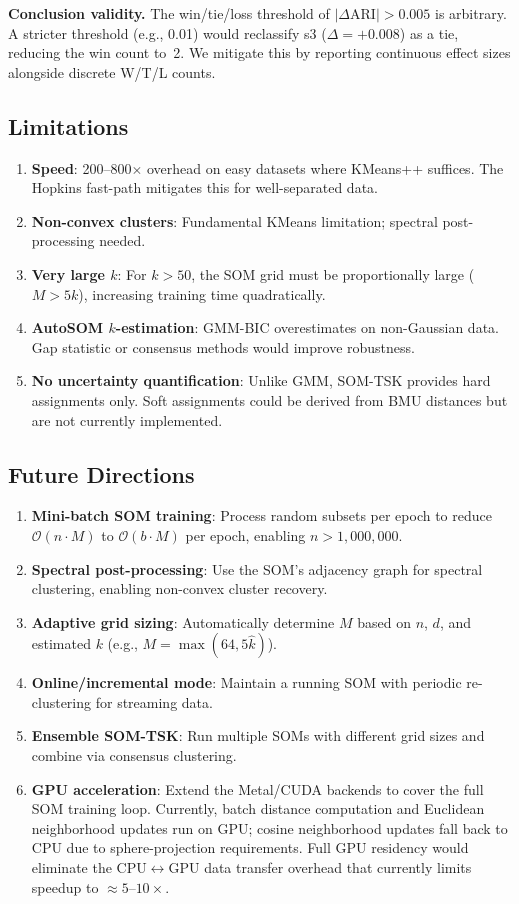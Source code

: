 \documentclass[journal]{IEEEtran}
\begin{document}
\textbf{Conclusion validity.}
The win/tie/loss threshold of $|\Delta\mathrm{ARI}| > 0.005$ is arbitrary.
A stricter threshold (e.g., 0.01) would reclassify s3 ($\Delta = +0.008$) as a tie, reducing the win count to~2.
We mitigate this by reporting continuous effect sizes alongside discrete W/T/L counts.

\subsection{Limitations}

\begin{enumerate}
  \item \textbf{Speed}: 200--800$\times$ overhead on easy datasets where KMeans++ suffices. The Hopkins fast-path mitigates this for well-separated data.
  \item \textbf{Non-convex clusters}: Fundamental KMeans limitation; spectral post-processing needed.
  \item \textbf{Very large $k$}: For $k > 50$, the SOM grid must be proportionally large ($M > 5k$), increasing training time quadratically.
  \item \textbf{AutoSOM $k$-estimation}: GMM-BIC overestimates on non-Gaussian data. Gap statistic or consensus methods would improve robustness.
  \item \textbf{No uncertainty quantification}: Unlike GMM, SOM-TSK provides hard assignments only. Soft assignments could be derived from BMU distances but are not currently implemented.
\end{enumerate}

\subsection{Future Directions}

\begin{enumerate}
  \item \textbf{Mini-batch SOM training}: Process random subsets per epoch to reduce $\mathcal{O}(n \cdot M)$ to $\mathcal{O}(b \cdot M)$ per epoch, enabling $n > 1{,}000{,}000$.
  \item \textbf{Spectral post-processing}: Use the SOM's adjacency graph for spectral clustering, enabling non-convex cluster recovery.
  \item \textbf{Adaptive grid sizing}: Automatically determine $M$ based on $n$, $d$, and estimated $k$ (e.g., $M = \max(64, 5\hat{k})$).
  \item \textbf{Online/incremental mode}: Maintain a running SOM with periodic re-clustering for streaming data.
  \item \textbf{Ensemble SOM-TSK}: Run multiple SOMs with different grid sizes and combine via consensus clustering.
  \item \textbf{GPU acceleration}: Extend the Metal/CUDA backends to cover the full SOM training loop. Currently, batch distance computation and Euclidean neighborhood updates run on GPU; cosine neighborhood updates fall back to CPU due to sphere-projection requirements. Full GPU residency would eliminate the CPU$\leftrightarrow$GPU data transfer overhead that currently limits speedup to $\approx 5$--$10\times$.
\end{enumerate}
\end{document}
